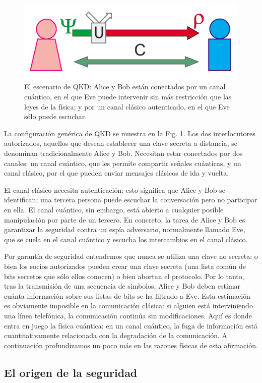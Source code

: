 \documentclass[a4paper,11pt]{book} %
\numberwithin{equation}{chapter}
\begin{document}
	\begin{figure}[t]
	\centering 
	\includegraphics[width=0.5\linewidth]{Figuras/Fig_QKD_setup.png}
	\caption{El escenario de QKD: Alice y Bob están conectados por un canal cuántico, en el que Eve puede intervenir sin más restricción que las leyes de la física; y por un canal clásico autenticado, en el que Eve sólo puede escuchar.}
	\label{Fig_QKD_setup.png}
	\end{figure}
	
La configuración genérica de QKD se muestra en la Fig. 1. Los dos interlocutores autorizados, aquellos que desean establecer una clave secreta a distancia, se denominan tradicionalmente Alice y Bob. Necesitan estar conectados por dos canales: un canal cuántico, que les permite compartir señales cuánticas, y un canal clásico, por el que pueden enviar mensajes clásicos de ida y vuelta.

El canal clásico necesita autenticación: esto significa que Alice y Bob se identifican; una tercera persona puede escuchar la conversación pero no participar en ella. El canal cuántico, sin embargo, está abierto a cualquier posible manipulación por parte de un tercero. En concreto, la tarea de Alice y Bob es garantizar la seguridad contra un espía adversario, normalmente llamado Eve, que se cuela en el canal cuántico y escucha los intercambios en el canal clásico.

Por garantía de seguridad entendemos que nunca se utiliza una clave no secreta: o bien los socios autorizados pueden crear una clave secreta (una lista común de bits secretos que sólo ellos conocen) o bien abortan el protocolo. Por lo tanto, tras la transmisión de una secuencia de símbolos, Alice y Bob deben estimar cuánta información sobre sus listas de bits se ha filtrado a Eve. Esta estimación es obviamente imposible en la comunicación clásica: si alguien está interviniendo una línea telefónica, la comunicación continúa sin modificaciones. Aquí es donde entra en juego la física cuántica: en un canal cuántico, la fuga de información está cuantitativamente relacionada con la degradación de la comunicación. A continuación profundizamos un poco más en las razones físicas de esta afirmación.

		\subsection{El origen de la seguridad}
\end{document}
